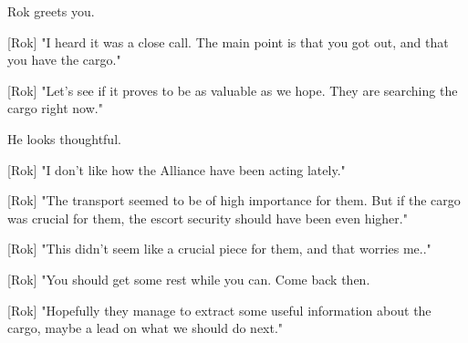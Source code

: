 \documentclass[a4paper,12pt]{article}
\begin{document}
Rok greets you. 

[Rok] "I heard it was a close call. The main point is that you got out, and
that you have the cargo." 

[Rok] "Let's see if it proves to be as valuable as we hope. They are searching the cargo right now."

He looks thoughtful. 

[Rok] "I don't like how the Alliance have been acting lately." 

[Rok] "The transport seemed to be of high importance for them. But if the cargo was crucial for them, the escort security
should have been even higher."

[Rok] "This didn't seem like a crucial piece for them, and that worries me.."

[Rok] "You should get some rest while you can. Come back then. 

[Rok] "Hopefully they manage to extract some useful information about the cargo, 
maybe a lead on what we should do next."
\end{document}
